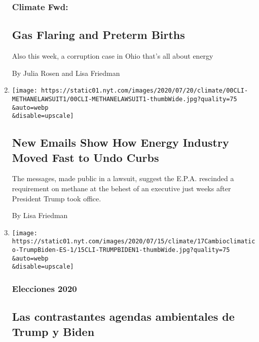\begin{enumerate}
  \hypertarget{climate-fwd-1}{%
  \subsubsection{Climate Fwd:}\label{climate-fwd-1}}

  \hypertarget{gas-flaring-and-preterm-births}{%
  \subsection{Gas Flaring and Preterm
  Births}\label{gas-flaring-and-preterm-births}}

  Also this week, a corruption case in Ohio that's all about energy

  By Julia Rosen and Lisa Friedman
\item
  \href{/2020/07/21/climate/trump-methane-climate-change.html}{}

  \texttt{[image: https://static01.nyt.com/images/2020/07/20/climate/00CLI-METHANELAWSUIT1/00CLI-METHANELAWSUIT1-thumbWide.jpg?quality=75\\\&auto=webp\\\&disable=upscale]}

  \hypertarget{new-emails-show-how-energy-industry-moved-fast-to-undo-curbs}{%
  \subsection{New Emails Show How Energy Industry Moved Fast to Undo
  Curbs}\label{new-emails-show-how-energy-industry-moved-fast-to-undo-curbs}}

  The messages, made public in a lawsuit, suggest the E.P.A. rescinded a
  requirement on methane at the behest of an executive just weeks after
  President Trump took office.

  By Lisa Friedman
\item
  \href{/es/2020/07/17/espanol/estados-unidos/cambio-climatico-trump-biden.html}{}

  \texttt{[image: https://static01.nyt.com/images/2020/07/15/climate/17Cambioclimatico-TrumpBiden-ES-1/15CLI-TRUMPBIDEN1-thumbWide.jpg?quality=75\\\&auto=webp\\\&disable=upscale]}

  \hypertarget{elecciones-2020}{%
  \subsubsection{Elecciones 2020}\label{elecciones-2020}}

  \hypertarget{las-contrastantes-agendas-ambientales-de-trump-y-biden}{%
  \subsection{Las contrastantes agendas ambientales de Trump y
  Biden}\label{las-contrastantes-agendas-ambientales-de-trump-y-biden}}


\end{enumerate}
